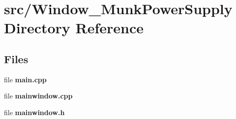 \section{src/\+Window\+\_\+\+Munk\+Power\+Supply Directory Reference}
\label{dir_8aad65aed6ced5dc63dc37ade2570533}
\subsection*{Files}
\begin{DoxyCompactItemize}
\item 
file \textbf{ main.\+cpp}
\item 
file \textbf{ mainwindow.\+cpp}
\item 
file \textbf{ mainwindow.\+h}
\end{DoxyCompactItemize}

